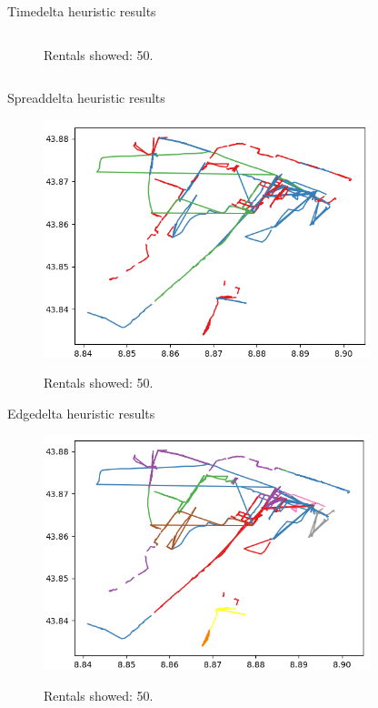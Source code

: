 \documentclass{beamer}
\begin{document}
\begin{frame}{Timedelta heuristic results}
\begin{columns}[t, onlytextwidth]
\begin{figure}[bt]
		\label{fig:timedelta-lineplot}
		\caption{Rentals showed: 50.}
	\end{figure}
\end{columns}
\end{frame}

\begin{frame}{Spreaddelta heuristic results}
	\begin{figure}[bt]
		\centering
		\includegraphics[width=0.85\textwidth]{spreaddelta-result}
		\label{fig:spreaddelta-result}
		\caption{Rentals showed: 50.}
	\end{figure}
\end{frame}

\begin{frame}{Edgedelta heuristic results}
\begin{figure}[bt]
	\centering
	\includegraphics[width=0.85\textwidth]{edgedelta-result}
	\label{fig:edgedelta-result}
	\caption{Rentals showed: 50.}
\end{figure}
\end{frame}
\end{document}
